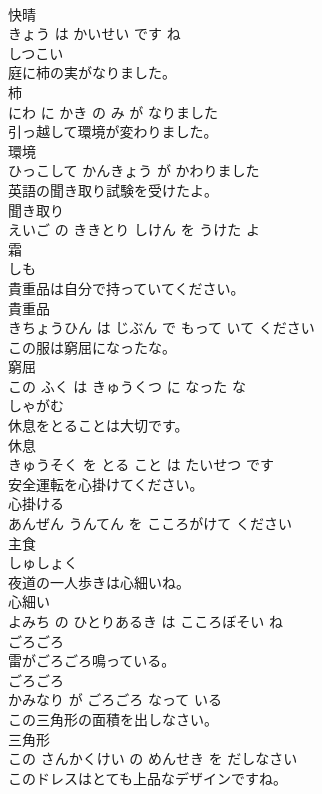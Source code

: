 \documentclass[8pt]{extreport}
\begin{document}
\begin{CJK}{UTF8}{min}
\\	快晴 
\\	きょう は かいせい です ね			
\\	しつこい	
\\	庭に柿の実がなりました。	
\\	柿 
\\	にわ に かき の み が なりました			
\\	引っ越して環境が変わりました。	
\\	環境 
\\	ひっこして かんきょう が かわりました			
\\	英語の聞き取り試験を受けたよ。	
\\	聞き取り 
\\	えいご の ききとり しけん を うけた よ			
\\	霜	
\\	しも		
\\	貴重品は自分で持っていてください。	
\\	貴重品 
\\	きちょうひん は じぶん で もって いて ください			
\\	この服は窮屈になったな。	
\\	窮屈 
\\	この ふく は きゅうくつ に なった な			
\\	しゃがむ	
\\	休息をとることは大切です。	
\\	休息 
\\	きゅうそく を とる こと は たいせつ です			
\\	安全運転を心掛けてください。	
\\	心掛ける 
\\	あんぜん うんてん を こころがけて ください			
\\	主食	
\\	しゅしょく		
\\	夜道の一人歩きは心細いね。	
\\	心細い 
\\	よみち の ひとりあるき は こころぼそい ね			
\\	ごろごろ	
\\	雷がごろごろ鳴っている。	
\\	ごろごろ 
\\	かみなり が ごろごろ なって いる			
\\	この三角形の面積を出しなさい。	
\\	三角形 
\\	この さんかくけい の めんせき を だしなさい			
\\	このドレスはとても上品なデザインですね。	

\end{CJK}
\end{document}
